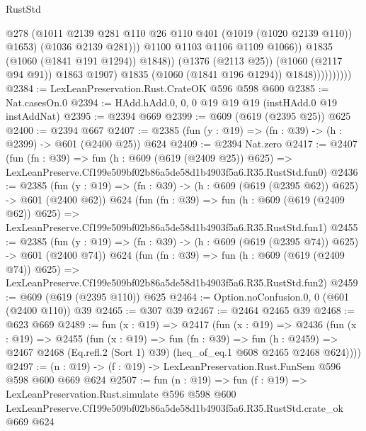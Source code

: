 \begin{lexlean}{RustStd}
\begin{coremodule}
                                      @278
                                      (@1011
                                        @2139
                                        @281
                                        @110
                                        @26
                                        @110
                                        @401
                                        (@1019 (@1020 @2139 @110))
                                        @1653)
                                      (@1036 @2139 @281)))
                                  @1100
                                  @1103
                                  @1106
                                  @1109
                                  @1066))
                              @1835
                              (@1060 (@1841 @191 @1294))
                              @1848))
                          (@1376 (@2113 @25))
                          (@1060 (@2117 @94 @91))
                          @1863
                          @1907)
                        @1835
                        (@1060 (@1841 @196 @1294))
                        @1848))))))))))
@2384 := LexLeanPreservation.Rust.CrateOK @596 @598 @600
@2385 := Nat.casesOn.{0}
@2394 := HAdd.hAdd.{0, 0, 0} @19 @19 @19 (instHAdd.{0} @19 instAddNat)
@2395 := @2394 @669
@2399 := @609 (@619 (@2395 @25)) @625
@2400 := @2394 @667
@2407 := @2385 (fun (y : @19) => (fn : @39) -> (h : @2399) -> @601 (@2400 @25)) @624
@2409 := @2394 Nat.zero
@2417 := @2407
    (fun (fn : @39) =>
    fun (h : @609 (@619 (@2409 @25)) @625) =>
    LexLeanPreserve.Cf199e509bf02b86a5de58d1b4903f5a6.R35.RustStd.fun0)
@2436 := @2385
    (fun (y : @19) => (fn : @39) -> (h : @609 (@619 (@2395 @62)) @625) -> @601 (@2400 @62))
    @624
    (fun (fn : @39) =>
    fun (h : @609 (@619 (@2409 @62)) @625) =>
    LexLeanPreserve.Cf199e509bf02b86a5de58d1b4903f5a6.R35.RustStd.fun1)
@2455 := @2385
    (fun (y : @19) => (fn : @39) -> (h : @609 (@619 (@2395 @74)) @625) -> @601 (@2400 @74))
    @624
    (fun (fn : @39) =>
    fun (h : @609 (@619 (@2409 @74)) @625) =>
    LexLeanPreserve.Cf199e509bf02b86a5de58d1b4903f5a6.R35.RustStd.fun2)
@2459 := @609 (@619 (@2395 @110)) @625
@2464 := Option.noConfusion.{0, 0} (@601 (@2400 @110)) @39
@2465 := @307 @39
@2467 := @2464 @2465 @39
@2468 := @623 @669
@2489 := fun (x : @19) =>
  @2417
    (fun (x : @19) =>
    @2436
      (fun (x : @19) =>
      @2455
        (fun (x : @19) =>
        fun (fn : @39) =>
        fun (h : @2459) =>
        @2467 @2468 (Eq.refl.{2} (Sort 1) @39) (heq_of_eq.{1} @608 @2465 @2468 @624))))
@2497 := (n : @19) -> (f : @19) -> LexLeanPreservation.Rust.FunSem @596 @598 @600 @669 @624
@2507 := fun (n : @19) =>
  fun (f : @19) =>
  LexLeanPreservation.Rust.simulate
    @596
    @598
    @600
    LexLeanPreserve.Cf199e509bf02b86a5de58d1b4903f5a6.R35.RustStd.crate_ok
    @669
    @624
\end{coremodule}
\end{lexlean}
